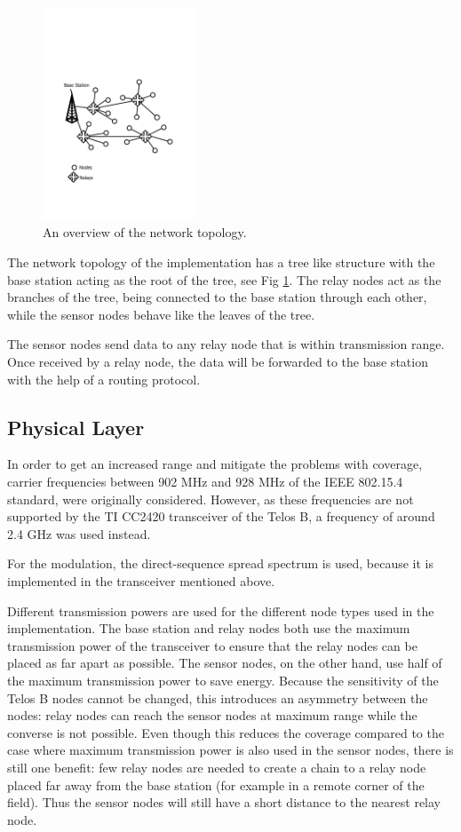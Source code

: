 \documentclass[conference]{IEEEtran}
\begin{document}
\begin{figure}
    \centering
    \includegraphics[trim= 0 150  0 150, clip, width=0.4\textwidth]{Figure1.pdf}
    \caption{An overview of the network topology.}
    \label{fig:topology}
\end{figure}

The network topology of the implementation has a tree like structure with
the base station acting as the root of the tree, see Fig \ref{fig:topology}.
The relay nodes act as the branches of the tree, being connected to the base
station through each other, while the sensor nodes behave like the leaves of
the tree.

The sensor nodes send data to any relay node that is within transmission range.
Once received by a relay node, the data will be forwarded to the base station
with the help of a routing protocol.

\subsection{Physical Layer}

In order to get an increased range and mitigate the problems with coverage,
carrier frequencies between 902 MHz and 928 MHz of the IEEE 802.15.4 standard,
were originally considered. However, as these frequencies are not supported by
the TI CC2420 transceiver of the Telos B, a frequency of around 2.4 GHz was
used instead.

For the modulation, the direct-sequence spread spectrum is used, because it is
implemented in the transceiver mentioned above.

Different transmission powers are used for the different node types used in the
implementation. The base station and relay nodes both use the maximum
transmission power of the transceiver to ensure that the relay nodes can be
placed as far apart as possible.  The sensor nodes, on the other hand, use half
of the maximum transmission power to save energy. Because the sensitivity of
the Telos B nodes cannot be changed, this introduces an asymmetry between the
nodes: relay nodes can reach the sensor nodes at maximum range while the
converse is not possible.  Even though this reduces the coverage compared to
the case where maximum transmission power is also used in the sensor nodes,
there is still one benefit: few relay nodes are needed to create a chain to
a relay node placed far away from the base station (for example in a remote
corner of the field). Thus the sensor nodes will still have a short distance to
the nearest relay node.
\end{document}
